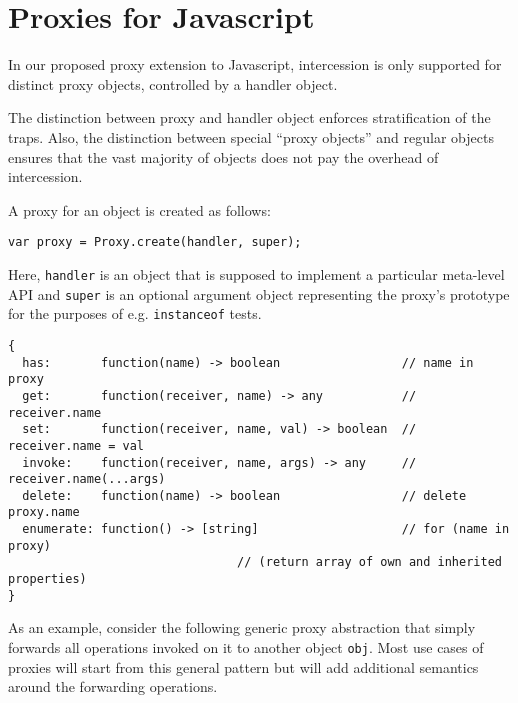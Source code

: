 \documentclass[10pt,legalpaper]{article}
\begin{document}
\section{Proxies for Javascript}
\label{sec:proxies_for_javascript}

In our proposed proxy extension to Javascript, intercession is only supported for distinct proxy objects, controlled by a handler object.

The distinction between proxy and handler object enforces stratification of the traps. Also, the distinction between special ``proxy objects'' and regular objects ensures that the vast majority of objects does not pay the overhead of intercession.


A proxy for an object is created as follows:

\begin{lstlisting}
var proxy = Proxy.create(handler, super);
\end{lstlisting}

Here, \texttt{handler} is an object that is supposed to implement a particular meta-level API and \texttt{super} is an optional argument object representing the proxy's prototype for the purposes of e.g. \texttt{instanceof} tests.

\begin{lstlisting}
{
  has:       function(name) -> boolean                 // name in proxy
  get:       function(receiver, name) -> any           // receiver.name
  set:       function(receiver, name, val) -> boolean  // receiver.name = val
  invoke:    function(receiver, name, args) -> any     // receiver.name(...args)
  delete:    function(name) -> boolean                 // delete proxy.name
  enumerate: function() -> [string]                    // for (name in proxy)
                                // (return array of own and inherited properties)
}
\end{lstlisting}

As an example, consider the following generic proxy abstraction that simply forwards all operations invoked on it to another object \texttt{obj}. Most use cases of proxies will start from this general pattern but will add additional semantics around the forwarding operations.
\end{document}

